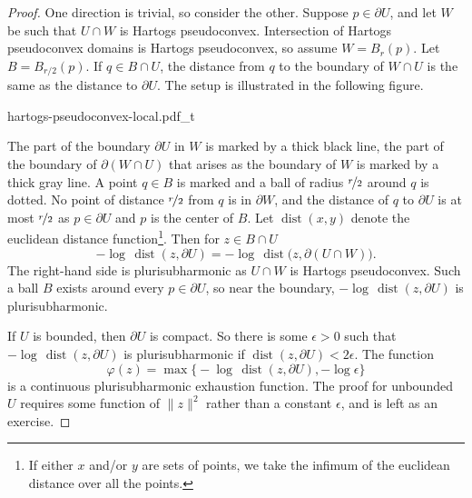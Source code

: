 \documentclass[12pt,openany]{book}
\newcommand{\snorm}[1]{\lVert {#1} \rVert}
\theoremstyle{plain}
\theoremstyle{remark}
\theoremstyle{definition}
\newenvironment{myfig}{%
    \begin{center}
}{%
    \end{center}
}
\theoremstyle{exercise}
\theoremstyle{example}
\begin{document}
\begin{proof}
One direction is trivial, so consider the other.
Suppose $p \in \partial U$, and let
$W$ be such that $U \cap W$
is Hartogs pseudoconvex.  Intersection of
Hartogs pseudoconvex domains is Hartogs pseudoconvex, so
assume $W = B_r(p)$.
Let $B = B_{r/2}(p)$.  If $q \in B \cap U$, the distance from $q$ to the boundary of $W \cap U$ is the same as
the distance to $\partial U$.  The setup is illustrated in the following
figure.

\begin{myfig}
{hartogs-pseudoconvex-local.pdf_t}
\end{myfig}

The part of the boundary $\partial U$ in $W$ is marked by a thick
black line, the part of the boundary of $\partial (W \cap U)$ that arises as
the boundary of $W$ is marked by a thick gray line.  A point $q \in B$ is
marked and a ball of radius $\nicefrac{r}{2}$ around $q$ is dotted.
No point of distance $\nicefrac{r}{2}$ from $q$ is in $\partial W$, and 
the distance of $q$ to $\partial U$ is at most $\nicefrac{r}{2}$ as $p \in \partial U$
and $p$ is the center of $B$.
%
Let $\operatorname{dist}(x,y)$ denote the
euclidean distance function\footnote{If either $x$ and/or $y$ are sets
of points, we take the infimum of the euclidean distance over all the points.}.
Then for $z \in B \cap U$
\begin{equation*}
- \log \, \operatorname{dist}(z, \partial U) = 
- \log \, \operatorname{dist}\bigl(z, \partial (U \cap W)\bigr).
\end{equation*}
The right-hand side is plurisubharmonic as $U \cap W$ is Hartogs
pseudoconvex.  Such a ball $B$ exists around every $p \in \partial U$, so near
the boundary, $- \log \, \operatorname{dist}(z, \partial U)$ is
plurisubharmonic.

If $U$ is bounded, then $\partial U$ is compact.  So there is some
$\epsilon > 0$ such that $- \log \, \operatorname{dist}(z, \partial U)$
is plurisubharmonic if $\operatorname{dist}(z, \partial U) < 2\epsilon$.
The function
\begin{equation*}
\varphi(z) = \max \bigl\{
- \log \, \operatorname{dist}(z, \partial U) , - \log \epsilon \bigr\} 
\end{equation*}
is a continuous plurisubharmonic exhaustion function.  The proof for
unbounded $U$ requires some function of $\snorm{z}^2$ rather than a constant
$\epsilon$,
and is left as an exercise.
\end{proof}
\end{document}
